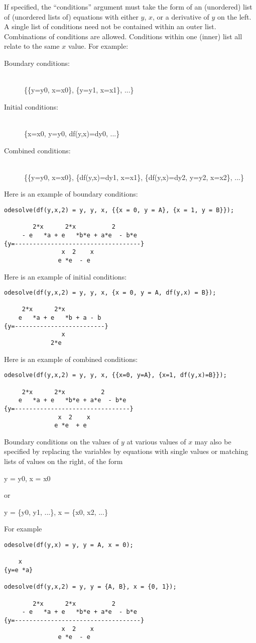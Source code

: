 If specified, the ``conditions'' argument must take the form of an
(unordered) list of (unordered lists of) equations with either $y$,
$x$, or a derivative of $y$ on the left.  A single list of conditions
need not be contained within an outer list.  Combinations of
conditions are allowed.  Conditions within one (inner) list all relate
to the same $x$ value.  For example:
\begin{description}
\item[Boundary conditions:] ~ \\
\{\{y=y0, x=x0\}, \{y=y1, x=x1\}, ...\}

\item[Initial conditions:] ~ \\
\{x=x0, y=y0, df(y,x)=dy0, ...\}

\item[Combined conditions:] ~ \\
\{\{y=y0, x=x0\}, \{df(y,x)=dy1, x=x1\}, \{df(y,x)=dy2, y=y2, x=x2\}, ...\}
\end{description}
Here is an example of boundary conditions:
\begin{verbatim}
odesolve(df(y,x,2) = y, y, x, {{x = 0, y = A}, {x = 1, y = B}});

        2*x      2*x          2
     - e   *a + e   *b*e + a*e  - b*e
{y=-----------------------------------}
                x  2    x
               e *e  - e
\end{verbatim}
Here is an example of initial conditions:
\begin{verbatim}
odesolve(df(y,x,2) = y, y, x, {x = 0, y = A, df(y,x) = B});

     2*x      2*x
    e   *a + e   *b + a - b
{y=-------------------------}
                x
             2*e
\end{verbatim}
Here is an example of combined conditions:
\begin{verbatim}
odesolve(df(y,x,2) = y, y, x, {{x=0, y=A}, {x=1, df(y,x)=B}});

     2*x      2*x          2
    e   *a + e   *b*e + a*e  - b*e
{y=--------------------------------}
               x  2    x
              e *e  + e
\end{verbatim}

Boundary conditions on the values of $y$ at various values of $x$ may
also be specified by replacing the variables by equations with single
values or matching lists of values on the right, of the form
\begin{center}
y = y0, x = x0
\end{center}
or
\begin{center}
y = \{y0, y1, ...\}, x = \{x0, x2, ...\}
\end{center}
For example
\begin{verbatim}
odesolve(df(y,x) = y, y = A, x = 0);

    x
{y=e *a}

odesolve(df(y,x,2) = y, y = {A, B}, x = {0, 1});

        2*x      2*x          2
     - e   *a + e   *b*e + a*e  - b*e
{y=-----------------------------------}
                x  2    x
               e *e  - e
\end{verbatim}



